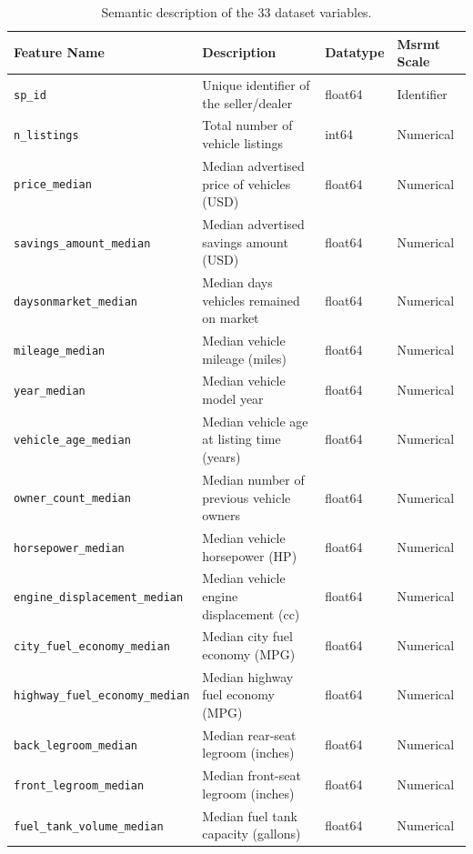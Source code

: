 \begin{table}[htbp]
  \centering
  \caption{Semantic description of the 33 dataset variables.}
  \label{tab:semantics}
  \footnotesize
  \renewcommand{\arraystretch}{0.92}
  \begin{tabular}{llll}
    \toprule
    \textbf{Feature Name} & \textbf{Description} & \textbf{Datatype} & \textbf{Msrmt Scale} \\
    \midrule
    \texttt{sp\_id} & Unique identifier of the seller/dealer & float64 & Identifier \\
    \texttt{n\_listings} & Total number of vehicle listings & int64 & Numerical \\
    \texttt{price\_median} & Median advertised price of vehicles (USD) & float64 & Numerical \\
    \texttt{savings\_amount\_median} & Median advertised savings amount (USD) & float64 & Numerical \\
    \texttt{daysonmarket\_median} & Median days vehicles remained on market & float64 & Numerical \\
    \texttt{mileage\_median} & Median vehicle mileage (miles) & float64 & Numerical \\
    \texttt{year\_median} & Median vehicle model year & float64 & Numerical \\
    \texttt{vehicle\_age\_median} & Median vehicle age at listing time (years) & float64 & Numerical \\
    \texttt{owner\_count\_median} & Median number of previous vehicle owners & float64 & Numerical \\
    \texttt{horsepower\_median} & Median vehicle horsepower (HP) & float64 & Numerical \\
    \texttt{engine\_displacement\_median} & Median vehicle engine displacement (cc) & float64 & Numerical \\
    \texttt{city\_fuel\_economy\_median} & Median city fuel economy (MPG) & float64 & Numerical \\
    \texttt{highway\_fuel\_economy\_median} & Median highway fuel economy (MPG) & float64 & Numerical \\
    \texttt{back\_legroom\_median} & Median rear-seat legroom (inches) & float64 & Numerical \\
    \texttt{front\_legroom\_median} & Median front-seat legroom (inches) & float64 & Numerical \\
    \texttt{fuel\_tank\_volume\_median} & Median fuel tank capacity (gallons) & float64 & Numerical \\

\end{tabular}
\end{table}
